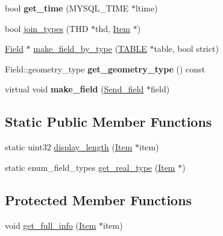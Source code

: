 \begin{DoxyCompactItemize}
\mbox{\label{classItem__type__holder_a7a89ece4f959e405c7cdf4235571e9a3}} 
bool {\bfseries get\+\_\+time} (M\+Y\+S\+Q\+L\+\_\+\+T\+I\+ME $\ast$ltime)
\item 
bool \mbox{\hyperlink{classItem__type__holder_a7c3826305012a52cf704d39513e945b1}{join\+\_\+types}} (T\+HD $\ast$thd, \mbox{\hyperlink{classItem}{Item}} $\ast$)
\item 
\mbox{\hyperlink{classField}{Field}} $\ast$ \mbox{\hyperlink{classItem__type__holder_aa6892a6186fb7fc4552ec53e045fe47d}{make\+\_\+field\+\_\+by\+\_\+type}} (\mbox{\hyperlink{structTABLE}{T\+A\+B\+LE}} $\ast$table, bool strict)
\item 
\mbox{\label{classItem__type__holder_a985ecfdb802002eb8237d34a47ca25ca}} 
Field\+::geometry\+\_\+type {\bfseries get\+\_\+geometry\+\_\+type} () const
\item 
\mbox{\label{classItem__type__holder_a538da964c5a5104d13fee46e82110682}} 
virtual void {\bfseries make\+\_\+field} (\mbox{\hyperlink{classSend__field}{Send\+\_\+field}} $\ast$field)
\end{DoxyCompactItemize}
\subsection*{Static Public Member Functions}
\begin{DoxyCompactItemize}
\item 
static uint32 \mbox{\hyperlink{classItem__type__holder_a8e24b0ff0b67f0be64bffbbefa6dcf96}{display\+\_\+length}} (\mbox{\hyperlink{classItem}{Item}} $\ast$item)
\item 
static enum\+\_\+field\+\_\+types \mbox{\hyperlink{classItem__type__holder_a69dd50259fdc25d5e6cd9c61f2d9fd20}{get\+\_\+real\+\_\+type}} (\mbox{\hyperlink{classItem}{Item}} $\ast$)
\end{DoxyCompactItemize}
\subsection*{Protected Member Functions}
\begin{DoxyCompactItemize}
\item 
void \mbox{\hyperlink{classItem__type__holder_a23713e2edd1acade849d36a8481461d4}{get\+\_\+full\+\_\+info}} (\mbox{\hyperlink{classItem}{Item}} $\ast$item)
\end{DoxyCompactItemize}
